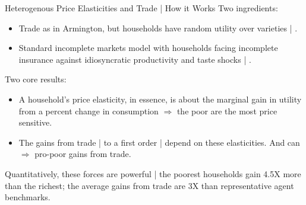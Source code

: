 \documentclass[9pt,pdftex,aspectratio=1610]{beamer}
\theoremstyle{definition}
\begin{document}
\begin{frame}[t]{Heterogenous Price Elasticities and Trade | How it Works}
\smallskip
Two ingredients:
\begin{itemize}
\item Trade as in Armington, but households have random utility over varieties | \citet{mcfadden1974frontiers}.
\smallskip
\item Standard incomplete markets model with households facing incomplete insurance against idiosyncratic productivity and taste shocks | \citet{bewley1979optimum}.
\end{itemize}
\bigskip
Two core results:
\begin{itemize}
\item A household's price elasticity, in essence, is about the marginal gain in utility from a percent change in consumption $\Rightarrow$ the poor are the most price sensitive.
\smallskip
\item The gains from trade | to a first order | depend on these elasticities. And can $\Rightarrow$ pro-poor gains from trade.
\end{itemize}
\bigskip
Quantitatively, these forces are powerful | the poorest households gain 4.5X more than the richest; the average gains from trade are 3X than representative agent benchmarks.
\end{frame}



\end{document}

